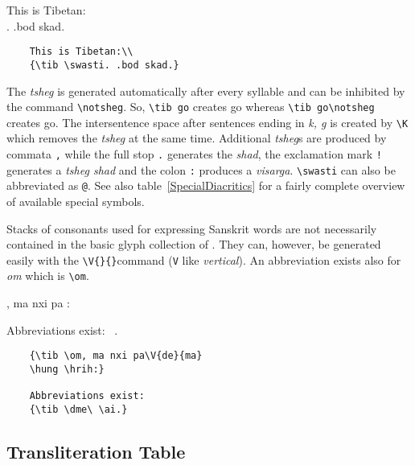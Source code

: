 \documentclass[a4paper,11pt]{article}
\newcommand\exa{\nopagebreak \begin{flushleft}\smallskip \nopagebreak
                \begin{minipage}[t]{6cm}\sloppy}
\newcommand\exb{\end{minipage}\kern 1cm\begin{minipage}[t]{8cm}\sloppy }
\newcommand\exc{\end{minipage}\kern -3cm \smallskip\end{flushleft}}
\begin{document}
\exa
	This is Tibetan:\\
	{\tib \swasti. .bod skad.}
\exb
	\begin{verbatim}
	This is Tibetan:\\
	{\tib \swasti. .bod skad.}
	\end{verbatim}
\exc

The \textit{tsheg} is generated automatically after every syllable
and can be inhibited by the command \verb|\notsheg|.
So, \verb|\tib go| creates {\tib go} whereas \verb|\tib go\notsheg|
creates {\tib go\notsheg}. The intersentence space after sentences
ending in \textit{k, g} is created by \verb|\K| which removes the
\textit{tsheg} at the same time. Additional \textit{tsheg}s are
produced by commata \verb|,| while the full stop \verb|.| generates
the \textit{shad}, the exclamation mark \verb-!- generates a
\textit{tsheg shad} and the colon \verb|:| produces a
\textit{visarga}. \verb|\swasti| can also be abbreviated as
\verb|@|. See also table~\ref{SpecialDiacritics} for a fairly complete
overview of available special symbols.

Stacks of consonants used for expressing Sanskrit words are not necessarily
contained in the basic glyph collection of \TibTeX. They can, however,
be generated easily with the \verb|\V{}{}|command (\texttt{V} like
\textit{vertical}). An abbreviation exists also for \emph{om} which is
\verb|\om|.

\exa
	{\tib \om, ma nxi pa
	\hung \hrih:}

	Abbreviations exist:
	{\tib \dme\ \ai.}
\exb
	\begin{verbatim}
	{\tib \om, ma nxi pa\V{de}{ma}
	\hung \hrih:}

	Abbreviations exist:
	{\tib \dme\ \ai.}
	\end{verbatim}
\exc


\subsection{Transliteration Table}
\end{document}
